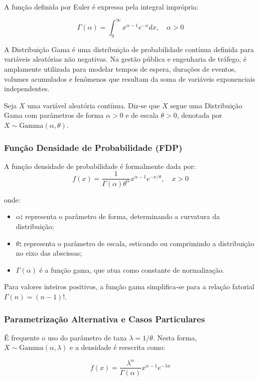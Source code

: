 A função definida por Euler é expressa pela integral imprópria:

$$\Gamma(\alpha)= \int_0^\infty x^{\alpha-1}e^{-x}dx, \quad \alpha>0$$

A Distribuição Gama é uma distribuição de probabilidade contínua definida para variáveis aleatórias não negativas. Na gestão pública e engenharia de tráfego, é amplamente utilizada para modelar tempos de espera, durações de eventos, volumes acumulados e fenômenos que resultam da soma de variáveis exponenciais independentes. \vskip0.3cm

\newpage
Seja $X$ uma variável aleatória contínua. Diz-se que $X$ segue uma Distribuição Gama com parâmetros de forma $\alpha > 0$ e de escala $\theta > 0$, denotada por $X \sim \text{Gamma}(\alpha, \theta)$. \vskip0.3cm


\subsubsection{Função Densidade de Probabilidade (FDP)}A função densidade de probabilidade é formalmente dada por:$$f(x) = \frac{1}{\Gamma(\alpha)\theta^\alpha} x^{\alpha - 1} e^{-x/\theta}, \quad x > 0$$

onde:


\begin{itemize}
\item \textbf{$\alpha$:} representa o parâmetro de forma, determinando a curvatura da distribuição;
\item \textbf{$\theta$:} representa o parâmetro de escala, esticando ou comprimindo a distribuição no eixo das abscissas;
\item \textbf{$\Gamma(\alpha)$} é a função gama, que atua como constante de normalização.
\end{itemize}


Para valores inteiros positivos, a função gama simplifica-se para a relação fatorial $\Gamma(n) = (n-1)!$.


\subsubsection{Parametrização Alternativa e Casos Particulares}

É frequente o uso do parâmetro de taxa $\lambda = 1/\theta$. Nesta forma, $X \sim \text{Gamma}(\alpha, \lambda)$ e a densidade é reescrita como:

$$f(x) = \frac{\lambda^\alpha}{\Gamma(\alpha)} x^{\alpha - 1} e^{-\lambda x}$$


